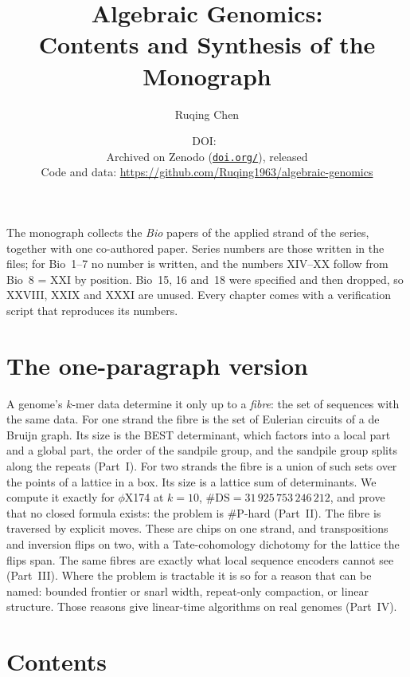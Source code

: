 \documentclass[11pt]{article}
\title{\bfseries Algebraic Genomics:\\[2pt] Contents and Synthesis of the Monograph}
\author{Ruqing Chen}
\date{\normalsize
  DOI:~\href{https://doi.org/\AGdoi}{\texttt{\AGdoi}}\\[3pt]
  \small Archived on Zenodo (\href{https://doi.org/\AGdoi}{\texttt{doi.org/\AGdoi}}),
  released \AGrelease\\[1pt]
  Code and data: \url{https://github.com/Ruqing1963/algebraic-genomics}}
\newcommand{\DS}{\mathrm{DS}}
\newcommand{\sP}{\#\mathrm{P}}
\begin{document}
\maketitle

\noindent The monograph collects the \emph{Bio} papers of the applied strand of the series, together with one
co-authored paper. Series numbers are those written in the files; for Bio~1--7 no number is written,
and the numbers XIV--XX follow from Bio~8 = XXI by position. Bio~15, 16 and~18 were specified and then
dropped, so XXVIII, XXIX and XXXI are unused. Every chapter comes with a verification script that
reproduces its numbers.

\section*{The one-paragraph version}

A genome's $k$-mer data determine it only up to a \emph{fibre}: the set of sequences with the same
data. For one strand the fibre is the set of Eulerian circuits of a de Bruijn graph. Its size is the BEST
determinant, which factors into a local part and a global part, the order of the sandpile group, and the
sandpile group splits along the repeats (Part~I). For two strands the fibre is a union of such sets over the
points of a lattice in a box. Its size is a lattice sum of determinants. We compute it exactly for
$\phi$X174 at $k=10$, $\#\DS=31\,925\,753\,246\,212$, and prove that no closed formula exists: the
problem is $\sP$-hard (Part~II). The fibre is traversed by explicit moves. These are chips on one strand,
and transpositions and inversion flips on two, with a Tate-cohomology dichotomy for the lattice the flips
span. The same fibres are exactly what local sequence encoders cannot see (Part~III). Where the problem
is tractable it is so for a reason that can be named: bounded frontier or snarl width, repeat-only
compaction, or linear structure. Those reasons give linear-time algorithms on real genomes (Part~IV).

\section*{Contents}
\end{document}
